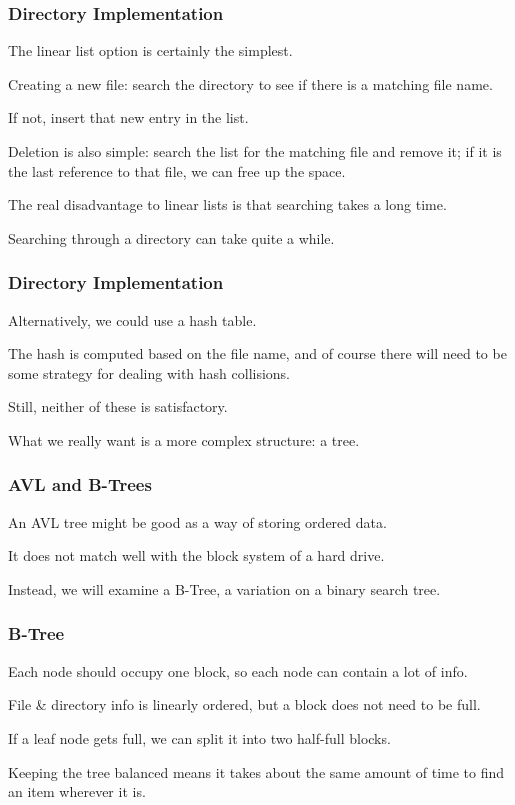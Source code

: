 \begin{frame}
\frametitle{Directory Implementation}

The linear list option is certainly the simplest. 

Creating a new file: search the directory to see if there is a matching file name. 

If not, insert that new entry in the list. 

Deletion is also simple: search the list for the matching file and remove it; if it is the last reference to that file, we can free up the space. 

The real disadvantage to linear lists is that searching takes a long time. 

Searching through a directory can take quite a while.

\end{frame}

\begin{frame}
\frametitle{Directory Implementation}

Alternatively, we could use a hash table. 

The hash is computed based on the file name, and of course there will need to be some strategy for dealing with hash collisions. 

Still, neither of these is satisfactory. 

What we really want is a more complex structure: a tree.


\end{frame}

\begin{frame}
\frametitle{AVL and B-Trees}


An AVL tree might be good as a way of storing ordered data. 

It does not match well with the block system of a hard drive. 

Instead, we will examine a B-Tree, a variation on a binary search tree. 


\end{frame}

\begin{frame}
\frametitle{B-Tree}

Each node should occupy one block, so each node can contain a lot of info. 

File \& directory info is linearly ordered, but a block does not need to be full. 

If a leaf node gets full, we can split it into two half-full blocks. 

Keeping the tree balanced means it takes about the same amount of time to find an item wherever it is.


\end{frame}

